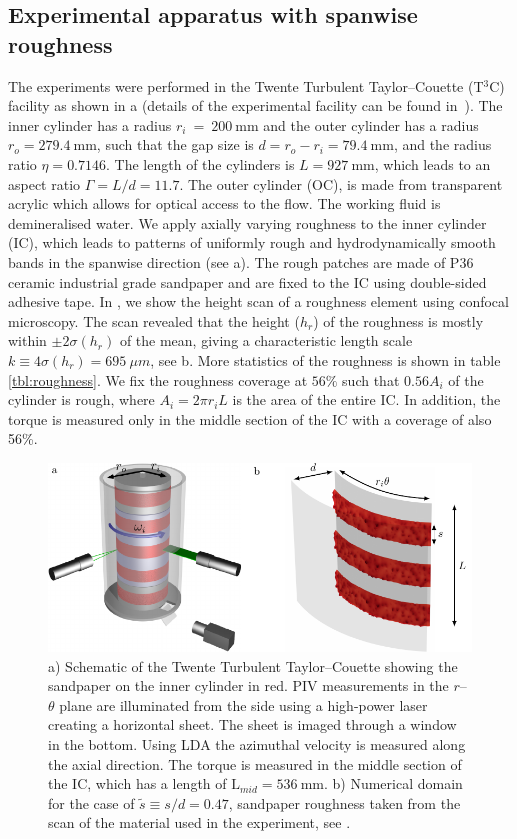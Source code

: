 \subsection{Experimental apparatus with spanwise roughness}
The experiments were performed in the Twente Turbulent Taylor--Couette (T$^3$C) facility as shown in a (details of the experimental facility can be found in~\citet{vanGils2011}). The inner cylinder has a radius $r_i~=~\SI{200}{\mm}$ and the outer cylinder has a radius $r_o = \SI{279.4}{\mm}$, such that the gap size is $d=r_o-r_i=\SI{79.4}{\mm}$, and the radius ratio $\eta=0.7146$. The length of the cylinders is $L = \SI{927}{\milli \metre}$, which leads to an aspect ratio $\Gamma=L/d=11.7$. The outer cylinder (OC), is made from transparent acrylic which allows for optical access to the flow. The working fluid is demineralised water. We apply axially varying roughness to the inner cylinder (IC), which leads to patterns of uniformly rough and hydrodynamically smooth bands in the spanwise direction (see a). The rough patches are made of P36 ceramic industrial grade sandpaper and are fixed to the IC using double-sided adhesive tape. In , we show the height scan of a roughness element using confocal microscopy. The scan revealed that the height ($h_r$) of the roughness is mostly within $\pm2\sigma(h_r)$ of the mean, giving a characteristic length scale $k \equiv 4\sigma(h_r) = \SI{695}{\mu m}$, see b. More statistics of the roughness is shown in table\,\ref{tbl:roughness}. We fix the roughness coverage at $56\%$ such that $0.56 A_i$ of the cylinder is rough, where $A_i=2\pi r_i L$ is the area of the entire IC. In addition, the torque is measured only in the middle section of the IC with a coverage of also 56\%.
%
\begin{figure}
\centering
\includegraphics{fig2_setupnum.pdf}
\caption{a) Schematic of the Twente Turbulent Taylor--Couette showing the sandpaper on the inner cylinder in red. PIV measurements in the $r$--$\theta$ plane are illuminated from the side using a high-power laser creating a horizontal sheet. The sheet is imaged through a window in the bottom. Using LDA the azimuthal velocity is measured along the axial direction. The torque is measured in the middle section of the IC, which has a length of $\text{L}_{mid}=\SI{536}{\mm}$. b) Numerical domain for the case of $\tilde s\equiv s/d=0.47$, sandpaper roughness taken from the scan of the material used in the experiment, see \protect{}.}
\label{fig:setupnum}
\end{figure}
